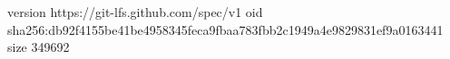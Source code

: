version https://git-lfs.github.com/spec/v1
oid sha256:db92f4155be41be4958345feca9fbaa783fbb2c1949a4e9829831ef9a0163441
size 349692
